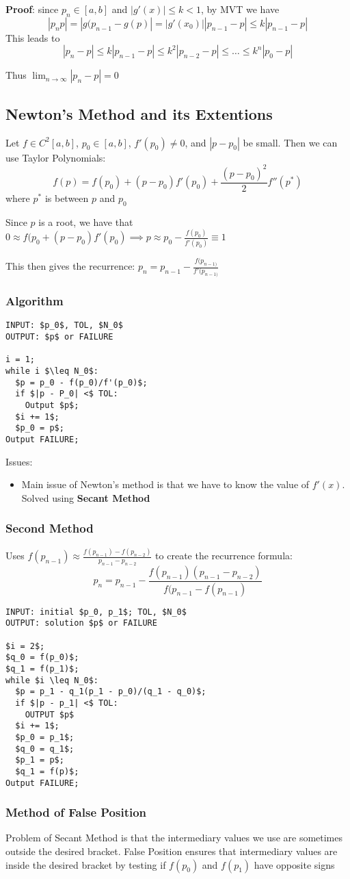 \documentclass{article}
\begin{document}
\textbf{Proof}: since $p_n \in [a,b]$ and $|g'(x)| \leq k < 1$, by MVT we have
\[|p_n p| = |g(p_{n-1} - g(p)| = |g'(x_0)||p_{n-1} - p| \leq k|p_{n-1} - p|\]
This leads to
\[|p_n - p| \leq k|p_{n-1} - p| \leq k^2|p_{n-2} - p| \leq \ldots \leq k^n|p_0 - p|\]

Thus $\lim_{n \rightarrow \infty}|p_n - p| = 0$
\subsection{Newton's Method and its Extentions}
Let $f \in C^2[a,b]$, $p_0 \in [a,b]$, $f'(p_0) \neq 0$, and $|p- p_0|$ be small. Then we can use Taylor Polynomials:
\[f(p) = f(p_0) + (p-p_0)f'(p_0) + \frac{(p-p_0)^2}{2}f''(p^*)\]
where $p^*$ is between $p$ and $p_0$

Since $p$ is a root, we have that $0 \approx f(p_0 + (p-p_0)f'(p_0) \implies p \approx p_0 - \frac{f(p_0)}{f'(p_0)} \equiv 1$

This then gives the recurrence: $p_n = p_{n-1} - \frac{f(p_{n-1)}}{f'(p_{n - 1)}}$
\subsubsection{Algorithm}
\begin{lstlisting}
INPUT: $p_0$, TOL, $N_0$ 
OUTPUT: $p$ or FAILURE

i = 1;
while i $\leq N_0$:
  $p = p_0 - f(p_0)/f'(p_0)$;
  if $|p - P_0| <$ TOL:
    Output $p$;
  $i += 1$;
  $p_0 = p$;
Output FAILURE;
\end{lstlisting}
Issues:
\begin{itemize}
  \item Main issue of Newton's method is that we have to know the value of $f'(x)$. Solved using \textbf{Secant Method}
\end{itemize}
\subsubsection{Second Method}
Uses $f(p_{n-1}) \approx \frac{f(p_{n-1}) - f(p_{n - 2})}{p_{n-1} - p_{n-2}}$ to create the recurrence formula:
\[ p_n = p_{n - 1} - \frac{f(p_{n-1})(p_{n - 1} - p_{n-2})}{f(p_{n-1} - f(p_{n-1})}\]
\begin{lstlisting}
INPUT: initial $p_0, p_1$; TOL, $N_0$ 
OUTPUT: solution $p$ or FAILURE

$i = 2$;
$q_0 = f(p_0)$;
$q_1 = f(p_1)$;
while $i \leq N_0$:
  $p = p_1 - q_1(p_1 - p_0)/(q_1 - q_0)$;
  if $|p - p_1| <$ TOL:
    OUTPUT $p$
  $i += 1$;
  $p_0 = p_1$;
  $q_0 = q_1$;
  $p_1 = p$;
  $q_1 = f(p)$;
Output FAILURE;
\end{lstlisting}
\subsubsection{Method of False Position}
Problem of Secant Method is that the intermediary values we use are sometimes outside the desired bracket. False Position ensures that intermediary values are inside the desired bracket by testing if $f(p_0)$ and $f(p_1)$ have opposite signs
\end{document}
